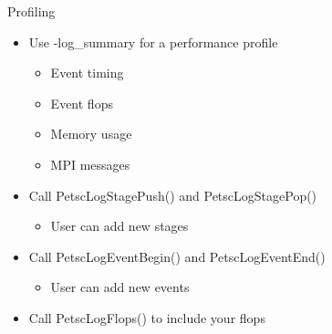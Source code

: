 \begin{frame}{Profiling}

\begin{itemize}
  \item Use {\kb -log\_summary} for a performance profile
  \begin{itemize}
    \item Event timing
    \item Event flops
    \item Memory usage
    \item MPI messages
  \end{itemize}

  \item Call {\kb PetscLogStagePush()} and {\kb PetscLogStagePop()}
  \begin{itemize}
    \item User can add new stages
  \end{itemize}

  \item Call {\kb PetscLogEventBegin()} and {\kb PetscLogEventEnd()}
  \begin{itemize}
    \item User can add new events
  \end{itemize}

  \item Call {\kb PetscLogFlops()} to include your flops
\end{itemize}

\end{frame}
